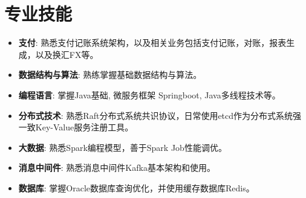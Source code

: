 \documentclass{resume}
\begin{document}
\section{专业技能}
\begin{itemize}[parsep=0.2ex]
  \item \textbf{支付}: 熟悉支付记账系统架构，以及相关业务包括支付记账，对账，报表生成，以及换汇FX等。
  \item \textbf{数据结构与算法}: 熟练掌握基础数据结构与算法。
  \item \textbf{编程语言}: 掌握Java基础, 微服务框架 Springboot, Java多线程技术等。
  \item \textbf{分布式技术}: 熟悉Raft分布式系统共识协议，日常使用etcd作为分布式系统强一致Key-Value服务注册工具。
  \item \textbf{大数据}: 熟悉Spark编程模型，善于Spark Job性能调优。
  \item \textbf{消息中间件}: 熟悉消息中间件Kafka基本架构和使用。
  \item \textbf{数据库}: 掌握Oracle数据库查询优化，并使用缓存数据库Redis。
\end{itemize}
\end{document}
